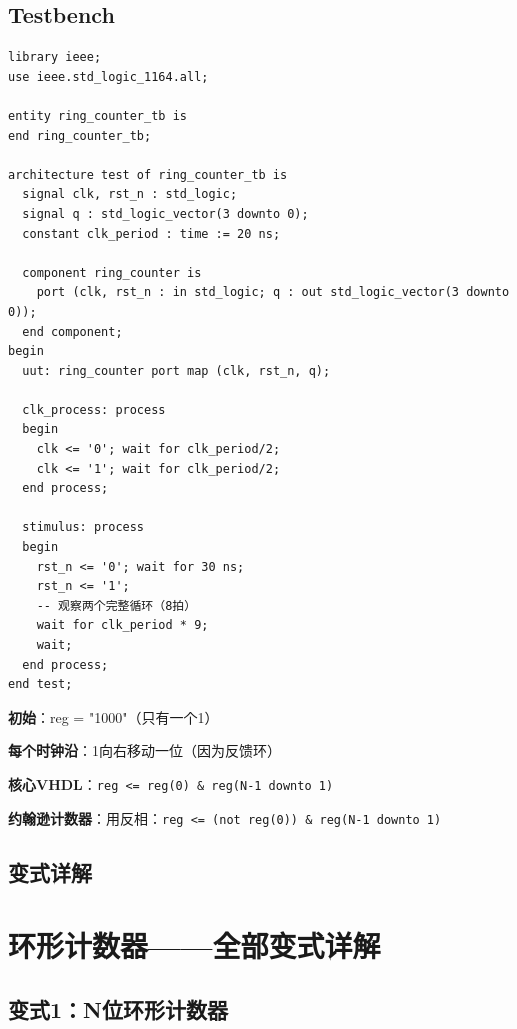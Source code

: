 \section{Testbench}

\begin{lstlisting}[caption={环形计数器Testbench}]
library ieee;
use ieee.std_logic_1164.all;

entity ring_counter_tb is
end ring_counter_tb;

architecture test of ring_counter_tb is
  signal clk, rst_n : std_logic;
  signal q : std_logic_vector(3 downto 0);
  constant clk_period : time := 20 ns;

  component ring_counter is
    port (clk, rst_n : in std_logic; q : out std_logic_vector(3 downto 0));
  end component;
begin
  uut: ring_counter port map (clk, rst_n, q);

  clk_process: process
  begin
    clk <= '0'; wait for clk_period/2;
    clk <= '1'; wait for clk_period/2;
  end process;

  stimulus: process
  begin
    rst_n <= '0'; wait for 30 ns;
    rst_n <= '1';
    -- 观察两个完整循环（8拍）
    wait for clk_period * 9;
    wait;
  end process;
end test;
\end{lstlisting}

\begin{examtip}[环形计数器秒杀法]
\textbf{初始}：reg = "1000"（只有一个1）

\textbf{每个时钟沿}：1向右移动一位（因为反馈环）

\textbf{核心VHDL}：\texttt{reg <= reg(0) \& reg(N-1 downto 1)}

\textbf{约翰逊计数器}：用反相：\texttt{reg <= (not reg(0)) \& reg(N-1 downto 1)}
\end{examtip}

\section{变式详解}
\chapter{环形计数器——全部变式详解}

\section{变式1：N位环形计数器}

